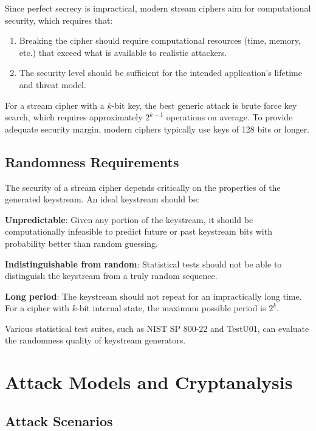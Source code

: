 \documentclass[12pt,a4paper,oneside]{report}
\begin{document}
Since perfect secrecy is impractical, modern stream ciphers aim for computational security, which requires that:

\begin{enumerate}
    \item Breaking the cipher should require computational resources (time, memory, etc.) that exceed what is available to realistic attackers.
    
    \item The security level should be sufficient for the intended application's lifetime and threat model.
\end{enumerate}

For a stream cipher with a $k$-bit key, the best generic attack is brute force key search, which requires approximately $2^{k-1}$ operations on average. To provide adequate security margin, modern ciphers typically use keys of 128 bits or longer.

\subsection{Randomness Requirements}

The security of a stream cipher depends critically on the properties of the generated keystream. An ideal keystream should be:

\textbf{Unpredictable}: Given any portion of the keystream, it should be computationally infeasible to predict future or past keystream bits with probability better than random guessing.

\textbf{Indistinguishable from random}: Statistical tests should not be able to distinguish the keystream from a truly random sequence.

\textbf{Long period}: The keystream should not repeat for an impractically long time. For a cipher with $k$-bit internal state, the maximum possible period is $2^k$.

Various statistical test suites, such as NIST SP 800-22 and TestU01, can evaluate the randomness quality of keystream generators.

\section{Attack Models and Cryptanalysis}
\label{sec:attacks}

\subsection{Attack Scenarios}
\end{document}
